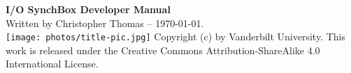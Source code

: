 \documentclass[letterpaper,11pt]{report}
\newcommand{\projectname}{I/O SynchBox }%
\newif\ifuserguide
\begin{document}

\pagestyle{empty}

\begin{center}
%
\vspace*{1in}
\ifuserguide
{\Huge \bfseries \projectname User Guide} \\
\else
{\Huge \bfseries \projectname Developer Manual} \\
\fi
{\footnotesize Written by Christopher Thomas -- \today.} \\
%
\vspace*{1.5in}
\texttt{[image: photos/title-pic.jpg]}
%
\vfill
{\scriptsize
Copyright (c) {\the\year} by Vanderbilt University. This work is released under
the Creative Commons Attribution-ShareAlike 4.0 International License.}
%
\end{center}
%
\clearpage
%
\pagestyle{plain}
\setcounter{page}{1}
%
\tableofcontents
%
\clearpage
\pagestyle{plain}
\setcounter{page}{1}
\renewcommand{\thispagestyle}[1]{}



\clearpage

\clearpage

\clearpage

%
\ifuserguide
\else
\clearpage

\clearpage

\clearpage

\clearpage

\appendix

\fi
\end{document}
